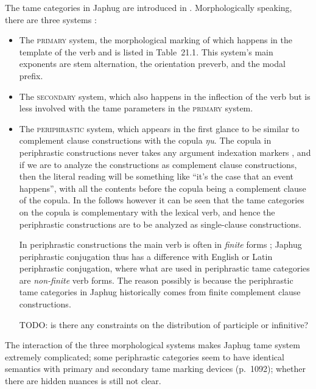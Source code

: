 \documentclass[a4paper, oneside, 12pt]{report}
\newcommand*{\citechap}[1]{Ch~{#1}}
\newcommand*{\citetable}[1]{Table~{#1}}
\newcommand*{\citepage}[1]{p.~{#1}}
\newcommand{\form}[1]{\emph{#1}}
\newcommand{\category}[1]{\textsc{#1}}
\begin{document}
The \acs{tame} categories in Japhug 
are introduced in \citet[\citechap{21}]{jacques2021grammar}.
Morphologically speaking, there are three systems
\citep[\citepage{516}]{jacques2019egophoric}:
\begin{itemize}
    \item The \category{primary} system, 
        the morphological marking of which 
        happens in the template of the verb and is listed in \citetable{21.1}.
        This system's main exponents are stem alternation, the orientation preverb,
        and the modal prefix.
    \item The \category{secondary} system, 
        which also happens in the inflection of the verb  
        but is less involved with the \acs{tame} parameters in the \category{primary} system.
    \item The \category{periphrastic} system, 
        which appears in the first glance to be similar to complement clause constructions 
        with the copula \form{ŋu}.
        The copula in periphrastic constructions 
        never takes any argument indexation markers \citep[\citepage{1090}]{jacques2021grammar},
        and if we are to analyze the constructions as complement clause constructions,
        then the literal reading will be something like  
        ``it's the case that an event happens'',
        with all the contents before the copula 
        being a complement clause of the copula.
        In the follows however it can be seen that 
        the \acs{tame} categories on the copula 
        is complementary with the lexical verb,
        and hence the periphrastic constructions are to be analyzed 
        as single-clause constructions.

        In periphrastic constructions 
        the main verb is often in \emph{finite} forms \citep[\citepage{1081}]{jacques2021grammar};
        Japhug periphrastic conjugation thus has 
        a difference with English or Latin periphrastic conjugation,
        where what are used in periphrastic \acs{tame} categories
        are \emph{non-finite} verb forms.
        The reason possibly is because the periphrastic \acs{tame} categories in Japhug
        historically comes from finite complement clause constructions.

        TODO: is there any constraints on the distribution of participle or infinitive?
\end{itemize}
The interaction of the three morphological systems makes Japhug \acs{tame} system extremely complicated;
some periphrastic categories seem to have identical semantics with 
primary and secondary \acs{tame} marking devices (\citepage{1092});
whether there are hidden nuances is still not clear.
\end{document}
